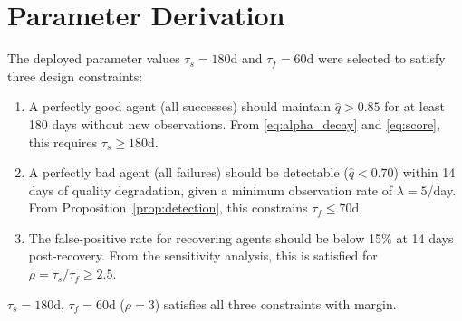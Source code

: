\documentclass[conference]{IEEEtran}
\begin{document}
\section{Parameter Derivation}
\label{app:params}

The deployed parameter values $\tau_s = 180\text{d}$ and
$\tau_f = 60\text{d}$ were selected to satisfy three
design constraints:
\begin{enumerate}
  \item A perfectly good agent (all successes) should
    maintain $\hat{q} > 0.85$ for at least 180 days without
    new observations. From \eqref{eq:alpha_decay} and
    \eqref{eq:score}, this requires $\tau_s \geq 180\text{d}$.
  \item A perfectly bad agent (all failures) should be
    detectable ($\hat{q} < 0.70$) within 14 days of
    quality degradation, given a minimum observation rate
    of $\lambda = 5$/day. From Proposition~\ref{prop:detection},
    this constrains $\tau_f \leq 70\text{d}$.
  \item The false-positive rate for recovering agents should
    be below 15\% at 14 days post-recovery.
    From the sensitivity analysis, this is satisfied for
    $\rho = \tau_s / \tau_f \geq 2.5$.
\end{enumerate}
$\tau_s = 180\text{d}$, $\tau_f = 60\text{d}$ ($\rho = 3$)
satisfies all three constraints with margin.
\end{document}

